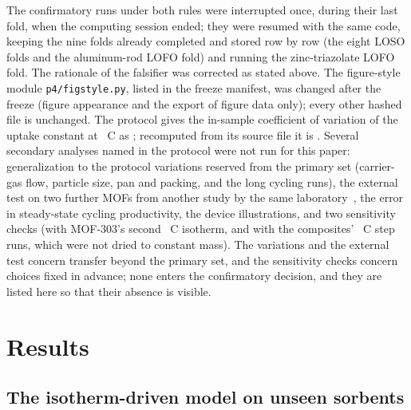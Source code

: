 \documentclass[12pt]{article}
\begin{document}
The confirmatory runs under both rules were interrupted once, during their last fold, when the computing session
ended; they were resumed with the same code, keeping the nine folds already completed and stored row by row (the
eight LOSO folds and the aluminum-rod LOFO fold) and running the zinc-triazolate LOFO fold. The rationale of the
falsifier was corrected as stated above. The figure-style module \texttt{p4/figstyle.py}, listed in the freeze
manifest, was changed after the freeze (figure appearance and the export of figure data only); every other hashed
file is unchanged. The protocol gives the in-sample coefficient of variation of the uptake constant at
~\textdegree C as ; recomputed from its source file it is . Several secondary analyses named in the protocol were not run for this paper:
generalization to the protocol variations reserved from the primary set (carrier-gas flow, particle size, pan and
packing, and the long cycling runs), the external test on two further MOFs from another study by the same laboratory~\cite{Gao2026Molecular}, the error in
steady-state cycling productivity, the device illustrations, and two sensitivity checks (with MOF-303's second
~\textdegree C isotherm, and with the composites' ~\textdegree C step runs, which were not dried to
constant mass). The variations and the external test concern transfer beyond the primary set, and the sensitivity
checks concern choices fixed in advance; none enters the confirmatory decision, and they are listed here so that
their absence is visible.

\section{Results}\label{sec:results}

\subsection{The isotherm-driven model on unseen sorbents}
\end{document}
